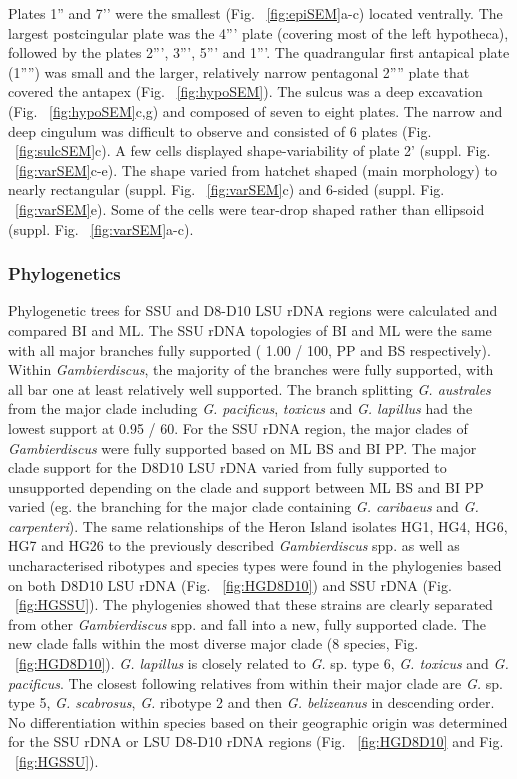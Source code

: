\documentclass[12pt]{article}
\begin{document}
Plates 1” and 7’’ were the smallest (Fig. ~\ref{fig:epiSEM}a-c) located ventrally. 
The largest postcingular plate was the 4''' plate (covering most of the left hypotheca), followed by the plates 2''', 3''', 5''' and 1'''. 
The quadrangular first antapical plate (1'''') was small and the larger, relatively narrow pentagonal 2'''' plate that covered the antapex (Fig. ~\ref{fig:hypoSEM}). 
The sulcus was a deep excavation (Fig. ~\ref{fig:hypoSEM}c,g) and composed of seven to eight plates. The narrow and deep cingulum was difficult to observe and consisted of 6 plates (Fig. ~\ref{fig:sulcSEM}c).
A few cells displayed shape-variability of plate 2' (suppl. Fig. ~\ref{fig:varSEM}c-e). 
The shape varied from hatchet shaped (main morphology) to nearly rectangular (suppl. Fig. ~\ref{fig:varSEM}c) and 6-sided (suppl. Fig. ~\ref{fig:varSEM}e). 
Some of the cells were tear-drop shaped rather than ellipsoid (suppl. Fig. ~\ref{fig:varSEM}a-c). 

\subsubsection{Phylogenetics}

Phylogenetic trees for SSU and D8-D10 LSU rDNA regions were calculated and compared BI and ML. 
The SSU rDNA  topologies of BI and ML were the same with all major branches fully supported ( 1.00 / 100, PP and BS respectively). 
Within \emph{Gambierdiscus}, the majority of the branches were fully supported, with all bar one at least relatively well supported. The branch splitting \emph{G. australes} from the major clade including \emph{G. pacificus}, \emph{toxicus} and \emph{G. lapillus} had the lowest support at 0.95 / 60.
For the SSU rDNA region, the major clades of \textit{Gambierdiscus }were fully supported based on ML BS and BI PP. 
The major clade support for the D8D10 LSU rDNA varied from fully supported to unsupported depending on the clade and support between ML BS and BI PP varied (eg. the branching for the major clade containing \emph{G. caribaeus} and \emph{G. carpenteri}). 
The same relationships of the Heron Island isolates HG1, HG4, HG6, HG7 and HG26 to the previously described \emph{Gambierdiscus} spp. as well as uncharacterised ribotypes and species types were found in the phylogenies based on both D8D10 LSU rDNA (Fig. ~\ref{fig:HGD8D10}) and SSU rDNA (Fig. ~\ref{fig:HGSSU}). 
The phylogenies showed that these strains are clearly separated from other \emph{Gambierdiscus} spp. and fall into a new, fully supported clade. 
The new clade falls within the most diverse major clade (8 species, Fig. ~\ref{fig:HGD8D10}). \emph{G. lapillus} is closely related to \emph{G.} sp. type 6, \emph{G. toxicus} and \emph{G. pacificus}. 
The closest following relatives from within their major clade are \emph{G.} sp. type 5, \emph{G. scabrosus}, \emph{G.} ribotype 2 and then \emph{G. belizeanus} in descending order. \\
No differentiation within species based on their geographic origin was determined for the SSU rDNA or LSU D8-D10 rDNA regions (Fig. ~\ref{fig:HGD8D10} and Fig. ~\ref{fig:HGSSU}).
\end{document}
